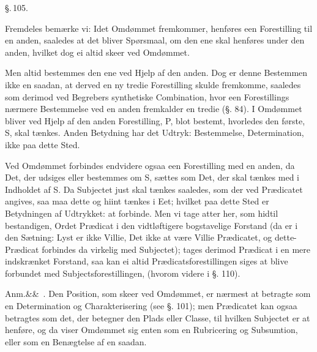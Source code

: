 \documentclass[12pt]{book}
\def\sperr#1{#1}%
\def\textit#1{#1}%
\def\emph#1{#1}%
\newcommand{\sperr}[1]{\textls[180]{#1}}
\newcommand{\parag}[1]{%
  \par\vspace{0.9\baselineskip}%
  {\centering\textit{\S.\,#1.}\par}%
  \vspace{0.35\baselineskip}%
  \noindent\hspace{\parindent}\ignorespaces
}
\newcommand{\anm}[1]{%
  \par\vspace{0.5\baselineskip}%
  \noindent\hspace{\parindent}\sperr{Anm.}\ifx&#1&\else~\textit{#1}.\fi
  \enspace\ignorespaces
}
\newcommand{\opage}[1]{\marginnote{\footnotesize\textit{[#1]}}}
\begin{document}
\parag{105}
Fremdeles bemærke vi: Idet Omdømmet fremkommer, henføres een Forestilling til en
anden, saaledes at det bliver Spørsmaal, om den ene skal henføres under den
anden, hvilket dog ei altid skeer ved Omdømmet.

\opage{255} Men altid bestemmes den ene ved Hjelp af den anden. Dog er denne Bestemmen ikke
en saadan, at derved en ny tredie Forestilling skulde fremkomme, saaledes som
derimod ved Begrebers synthetiske Combination, hvor een Forestillings nærmere
Bestemmelse ved en anden fremkalder en tredie (§. 84). I Omdømmet bliver ved
Hjelp af den anden Forestilling, \textit{P}, blot bestemt, hvorledes den første,
\textit{S}, skal tænkes. Anden Betydning har det Udtryk: Bestemmelse,
Determination, ikke paa dette Sted.

Ved Omdømmet forbindes endvidere ogsaa een Forestilling med en anden, da Det,
der udsiges eller bestemmes om \textit{S}, sættes som Det, der skal tænkes med i
Indholdet af \textit{S}. Da Subjectet just skal tænkes saaledes, som der ved
Prædicatet angives, saa maa dette og hiint tænkes i Eet; hvilket paa dette Sted
er Betydningen af Udtrykket: \emph{at forbinde}. Men vi tage atter her, som
hidtil bestandigen, Ordet Prædicat i den vidtløftigere bogstavelige Forstand (da
er i den Sætning: Lyst er ikke Villie, Det ikke at være Villie Prædicatet, og
dette-Prædicat forbindes da virkelig med Subjectet); tages derimod Prædicat i en
mere indskrænket Forstand, saa kan ei altid Prædicatsforestillingen siges at
blive forbundet med Subjectsforestillingen, (hvorom videre i §. 110).

\anm{} Den Position, som skeer ved Omdømmet, er nærmest at betragte som en
\emph{Determination og Charakterisering} (see §. 101); men
\opage{256} Prædicatet kan ogsaa betragtes som det, der betegner den \emph{Plads eller
Classe}, til hvilken Subjectet er at henføre, og da viser Omdømmet sig enten som
en \emph{Rubricering og Subsumtion}, eller som en \emph{Benægtelse} af en
saadan.
\end{document}
